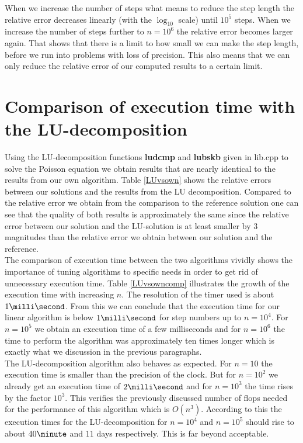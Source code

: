 \documentclass[11pt,a4wide]{article}
\begin{document}
When we increase the number of steps what means to reduce the step length the relative error decreases linearly (with the $\log_{10}$ scale) until $10^5$ steps. When we increase the number of steps further to $n=10^6$ the relative error becomes larger again. That shows that there is a limit to how small we can make the step length, before we run into problems with loss of precision. This also means that we can only reduce the relative error of our computed results to a certain limit.        
\section{Comparison of execution time with the LU-decomposition}
Using the LU-decomposition functions \textbf{ludcmp} and \textbf{lubskb}  given in lib.cpp to solve the Poisson equation we obtain results that are nearly identical to the results from our own algorithm. Table \ref{LUvsown} shows the relative errors between our solutions and the results from the LU decomposition. Compared to the relative error we obtain from the comparison to the reference solution one can see that the quality of both results is approximately the same since the relative error between our solution and the LU-solution is at least smaller by $3$ magnitudes than the relative error we obtain between our solution and the reference. \vspace{0.2cm}
\\ 
The comparison of execution time between the two algorithms vividly shows the importance of tuning algorithms to specific needs in order to get rid of unnecessary execution time. Table \ref{LUvsowncomp} illustrates the growth of the execution time with increasing $n$. The resolution of the timer used is about $1\milli\second$. From this we can conclude that the execution time for our linear algorithm is below $1\milli\second$ for step numbers up to $n=10^4$. For $n=10^5$ we obtain an execution time of a few milliseconds and for $n=10^6$ the time to perform the algorithm was approximately ten times longer which is exactly what we discussion in the previous paragraphs.
 \vspace{0.2cm}
\\
The LU-decomposition algorithm also behaves as expected.  For $n=10$ the execution time is smaller than the precision of the clock. But for $n=10^2$ we already get an execution time of $2\milli\second$ and for $n=10^3$ the time rises by the factor $10^3$. This verifies the previously discussed number of flops needed for the performance of this algorithm which is $O(n^3)$. According to this the execution times for the LU-decomposition for $n=10^4$ and $n=10^5$ should rise to about $40\minute$ and $11$ days respectively. This is far beyond acceptable.
\end{document}
